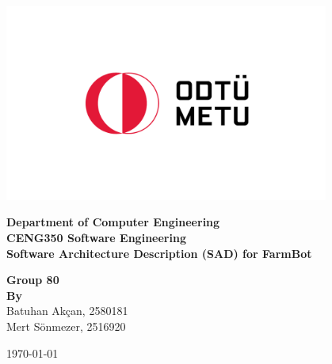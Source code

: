 \begin{titlepage}
   \begin{center}

       \includegraphics[width=0.8\textwidth]{Figures/metu_logo.png}
       \vspace{0.0cm}
     
            
        \textbf{\LARGE Department of  Computer Engineering} \\
        \vspace{0.5cm}
        \textbf{\LARGE CENG350 Software Engineering}\\
        \vspace{0.5cm} 
        \textbf{\LARGE Software Architecture Description (SAD) for FarmBot} \\
        \vspace{1.5cm} 
 

        \textbf{Group 80}\\
       \textbf{\textbf{By}} \\Batuhan Akçan, 2580181 \\ Mert Sönmezer, 2516920
       

       \vspace{1.5cm}
            
    
\vspace{0.5cm}
            


\today            
   \end{center}
\end{titlepage}